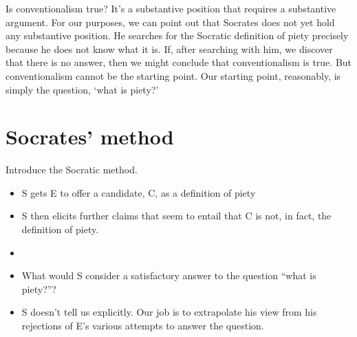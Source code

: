 \documentclass[oneside]{article}
\begin{document}
Is conventionalism true? It's a substantive position that requires a substantive argument. For our purposes, we can point out that Socrates does not yet hold any substantive position. He searches for the Socratic definition of piety precisely because he does not know what it is. If, after searching with him, we discover that there is no answer, then we might conclude that conventionalism is true. But conventionalism cannot be the starting point. Our starting point, reasonably, is simply the question, `what is piety?'


\section*{Socrates' method}
\item Introduce the Socratic method. 
\begin{itemize}
\item S gets E to offer a candidate, C, as a definition of piety
\item S then elicits further claims that seem to entail that C is not, in fact, the definition of piety. 
\end{itemize}
\begin{itemize}
\item 
\item What would S consider a satisfactory answer to the question ``what is piety?''?
\item S doesn't tell us explicitly. Our job is to extrapolate his view from his rejections of E's various attempts to answer the question.
\end{itemize}
\end{document}
